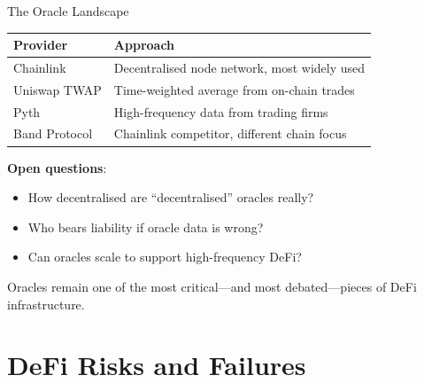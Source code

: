 \documentclass[10pt]{beamer}
\begin{document}
\begin{frame}{The Oracle Landscape}
  \begin{center}
  \begin{tabular}{lp{6.5cm}}
    \toprule
    \textbf{Provider} & \textbf{Approach} \\
    \midrule
    Chainlink & Decentralised node network, most widely used \\
    Uniswap TWAP & Time-weighted average from on-chain trades \\
    Pyth & High-frequency data from trading firms \\
    Band Protocol & Chainlink competitor, different chain focus \\
    \bottomrule
  \end{tabular}
  \end{center}
  
  \vspace{1em}
  \textbf{Open questions}:
  \begin{itemize}
    \item How decentralised are ``decentralised'' oracles really?
    \item Who bears liability if oracle data is wrong?
    \item Can oracles scale to support high-frequency DeFi?
  \end{itemize}
  
  \vspace{0.5em}
  Oracles remain one of the most critical---and most debated---pieces of DeFi infrastructure.
\end{frame}

\section{DeFi Risks and Failures}
\end{document}
